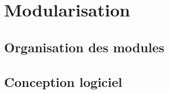 \documentclass[a4paper,12pt]{article}
\begin{document}
\section{Modularisation}
\label{sec:module}

\subsection{Organisation des modules}

\clearpage
\subsection{Conception logiciel}


%
\end{document}

